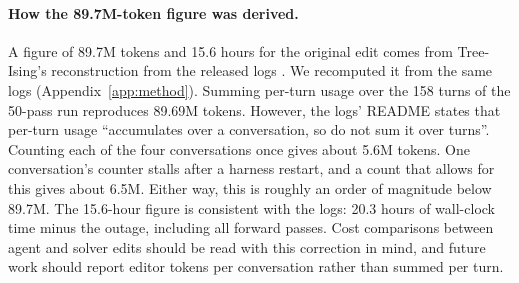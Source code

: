 \paragraph{How the 89.7M-token figure was derived.} A figure of 89.7M tokens and 15.6 hours for the original edit comes from Tree-Ising's reconstruction from the released logs \citep{ax2611_14210}. We recomputed it from the same logs (Appendix~\ref{app:method}). Summing per-turn usage over the 158 turns of the 50-pass run reproduces 89.69M tokens. However, the logs' README states that per-turn usage ``accumulates over a conversation, so do not sum it over turns''. Counting each of the four conversations once gives about 5.6M tokens. One conversation's counter stalls after a harness restart, and a count that allows for this gives about 6.5M. Either way, this is roughly an order of magnitude below 89.7M. The 15.6-hour figure is consistent with the logs: 20.3 hours of wall-clock time minus the outage, including all forward passes. Cost comparisons between agent and solver edits should be read with this correction in mind, and future work should report editor tokens per conversation rather than summed per turn.
